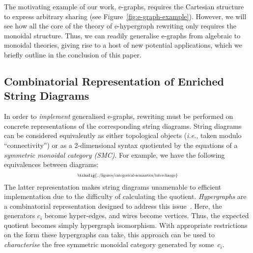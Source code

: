 The motivating example of our work, e-graphs, requires the Cartesian structure to express arbitrary sharing (see Figure~\ref{fig:e-graph-example}).
However, we will see how all the core of the theory of e-hypergraph rewriting only requires the monoidal structure. 
Thus, we can readily generalise e-graphs from algebraic to monoidal theories, giving rise to a  host of new potential applications, which we briefly outline in the conclusion of this paper.   

\subsection{Combinatorial Representation of Enriched String Diagrams}

In order to \textit{implement} generalised e-graphs, rewriting must be performed on concrete representations of the corresponding string diagrams.  
String diagrams can be considered equivalently as either topological objects (\textit{i.e.}, taken modulo ``connectivity'') or as a 2-dimensional syntax quotiented by the equations of a \textit{symmetric monoidal category (SMC)}.
For example, we have the following equivalences between diagrams:
\[
	\scalebox{0.6}{
	\tikzfig{../figures/categorical-semantics/interchange}
	}
\]
The latter representation makes string diagrams unamenable to efficient implementation due to the difficulty of calculating the quotient.
\emph{Hypergraphs} are a combinatorial representation designed to address this issue~\cite{bonchi_string_2022-1,bonchi_string_2022-2,bonchi_string_2022-3}.
Here, the generators $c_i$ become hyper-edges,  and wires become vertices.  
Thus, the expected quotient becomes simply hypergraph isomorphism. 
With appropriate restrictions on the form these hypergraphs can take, this approach can be used to \textit{characterise} the free symmetric monoidal category generated by some~$c_i$. 


